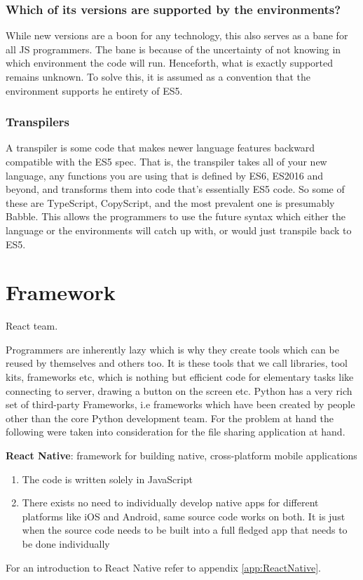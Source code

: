 \subsubsection{Which of its versions are supported by the environments?}
While new versions are a boon for any technology, this also serves as a bane for all JS programmers.  The bane is because of the uncertainty of not knowing in which environment the code will run. Henceforth, what is exactly supported remains unknown. To solve this, it is assumed as a convention that the environment supports he entirety of ES5.

\subsubsection{Transpilers}
A transpiler is some code that makes newer language features backward compatible with the ES5 spec. That is, the transpiler takes all of your new language, any functions you are using that is defined by ES6, ES2016 and beyond, and transforms them into code that's essentially ES5 code. So some of these are TypeScript, CopyScript, and the most prevalent one is presumably Babble. This allows the programmers to use the future syntax which either the language or the environments will catch up with, or would just transpile back to ES5.

\section {Framework}
\label{sec:ReactNative}
\begin{epigraphs}
%
      {React team}.
\end{epigraphs}
Programmers are inherently lazy which is why they create tools which can be reused by themselves and others too. It is these tools that we call libraries, tool kits, frameworks etc, which is nothing but efficient code for elementary tasks like connecting to server, drawing a button on the screen etc. Python has a very rich set of third-party Frameworks, i.e frameworks which have been created by people other than the core Python development team. For the problem at hand the following were taken into consideration for the file sharing application at hand.\par \bigskip
\textbf{React Native}: framework for building native, cross-platform mobile applications
  \begin{enumerate}
  \item The code is written solely in JavaScript
  \item There exists no need to individually develop native apps for different platforms like iOS and Android, same source code works on both. It is just when the source code needs to be built into a full fledged app that needs to be done individually
  \end{enumerate}
For an  introduction to React Native refer to appendix \ref{app:ReactNative}.

